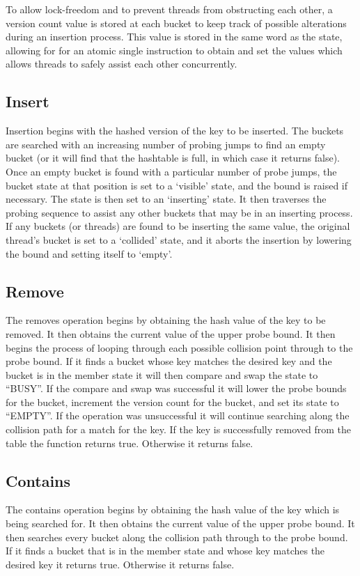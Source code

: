 \documentclass[journal]{IEEEtran}
\begin{document}
	To allow lock-freedom and to prevent threads from obstructing each other, a version count value is stored at each bucket to keep track of possible alterations during an insertion process. This value is stored in the same word as the state, allowing for for an atomic single instruction to obtain and set the values which allows threads to safely assist each other concurrently.

\subsection{Insert}
Insertion begins with the hashed version of the key to be inserted. The buckets are searched with an increasing number of probing jumps to find an empty bucket (or it will find that the hashtable is full, in which case it returns false). Once an empty bucket is found with a particular number of probe jumps, the bucket state at that position is set to a ‘visible’ state, and the bound is raised if necessary. The state is then set to an ‘inserting’ state. It then traverses the probing sequence to assist any other buckets that may be in an inserting process. If any buckets (or threads) are found to be inserting the same value, the original thread's bucket is set to a ‘collided’ state, and it aborts the insertion by lowering the bound and setting itself to ‘empty’.


\subsection{Remove}
The removes operation begins by obtaining the hash value of the key to be removed. It then obtains the current value of the upper probe bound. It then begins the process of looping through each possible collision point through to the probe bound. If it finds a bucket whose key matches the desired key and the bucket is in the member state it will then compare and swap the state to “BUSY”. If the compare and swap was successful it will lower the probe bounds for the bucket, increment the version count for the bucket, and set its state to “EMPTY”. If the operation was unsuccessful it will continue searching along the collision path for a match for the key. If the key is successfully removed from the table the function returns true. Otherwise it returns false.

\subsection{Contains}
The contains operation begins by obtaining the hash value of the key which is being searched for. It then obtains the current value of the upper probe bound. It then searches every bucket along the collision path through to the probe bound. If it finds a bucket that is in the member state and whose key matches the desired key it returns true. Otherwise it returns false.
\end{document}
